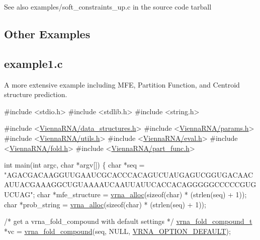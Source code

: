  \begin{DoxySeeAlso}{See also}
{\ttfamily examples/soft\+\_\+constraints\+\_\+up.\+c} in the source code tarball
\end{DoxySeeAlso}
\hypertarget{examples_c_ex_c_other}{}\subsection{Other Examples}\label{examples_c_ex_c_other}
\subsection*{example1.\+c }

A more extensive example including M\+FE, Partition Function, and Centroid structure prediction.


\begin{DoxyCodeInclude}
\textcolor{preprocessor}{#include <stdio.h>}
\textcolor{preprocessor}{#include <stdlib.h>}
\textcolor{preprocessor}{#include <string.h>}

\textcolor{preprocessor}{#include  <\hyperlink{data__structures_8h}{ViennaRNA/data\_structures.h}>}
\textcolor{preprocessor}{#include  <\hyperlink{params_8h}{ViennaRNA/params.h}>}
\textcolor{preprocessor}{#include  <\hyperlink{utils_8h}{ViennaRNA/utils.h}>}
\textcolor{preprocessor}{#include  <\hyperlink{eval_8h}{ViennaRNA/eval.h}>}
\textcolor{preprocessor}{#include  <\hyperlink{fold_8h}{ViennaRNA/fold.h}>}
\textcolor{preprocessor}{#include  <\hyperlink{part__func_8h}{ViennaRNA/part\_func.h}>}


\textcolor{keywordtype}{int}
main(\textcolor{keywordtype}{int}  argc,
     \textcolor{keywordtype}{char} *argv[])
\{
  \textcolor{keywordtype}{char}                  *seq =
    \textcolor{stringliteral}{"AGACGACAAGGUUGAAUCGCACCCACAGUCUAUGAGUCGGUGACAACAUUACGAAAGGCUGUAAAAUCAAUUAUUCACCACAGGGGGCCCCCGUGUCUAG"};
  \textcolor{keywordtype}{char}                  *mfe\_structure  = \hyperlink{group__utils_gaf37a0979367c977edfb9da6614eebe99}{vrna\_alloc}(\textcolor{keyword}{sizeof}(\textcolor{keywordtype}{char}) * (strlen(seq) + 1));
  \textcolor{keywordtype}{char}                  *prob\_string    = \hyperlink{group__utils_gaf37a0979367c977edfb9da6614eebe99}{vrna\_alloc}(\textcolor{keyword}{sizeof}(\textcolor{keywordtype}{char}) * (strlen(seq) + 1));

  \textcolor{comment}{/* get a vrna\_fold\_compound with default settings */}
  \hyperlink{group__fold__compound_structvrna__fc__s}{vrna\_fold\_compound\_t}  *vc = \hyperlink{group__fold__compound_ga6601d994ba32b11511b36f68b08403be}{vrna\_fold\_compound}(seq, NULL, 
      \hyperlink{group__fold__compound_gacea5b7ee6181c485f36e2afa0e9089e4}{VRNA\_OPTION\_DEFAULT});


\end{DoxyCodeInclude}
